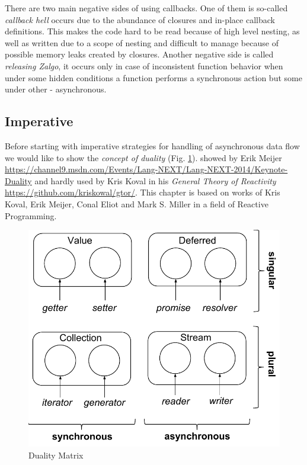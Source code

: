There are two main negative sides of using callbacks. One of them is so-called \textit{callback hell} occurs due to the abundance of closures and in-place callback definitions. This makes the code hard to be read because of high level nesting, as well as written due to a scope of nesting and difficult to manage because of possible memory leaks created by closures. Another negative side is called \textit{releasing Zalgo}\cite{zalgo}, it occurs only in case of inconsistent function behavior when under some hidden conditions a function performs a synchronous action but some under other - asynchronous.

\subsection{Imperative}
Before starting with imperative strategies for handling of asynchronous data flow we would like to show the \textit{concept of duality} (Fig. \ref{fig:dualityMatrix}). showed by Erik Meijer \url{https://channel9.msdn.com/Events/Lang-NEXT/Lang-NEXT-2014/Keynote-Duality} and hardly used by Kris Koval in his \textit{General Theory of Reactivity} \url{https://github.com/kriskowal/gtor/}. This chapter is based on works of Kris Koval, Erik Meijer, Conal Eliot and Mark S. Miller in a field of Reactive Programming.

\begin{figure}[ht]
	\label{fig:dualityMatrix}
	\centering
	\includegraphics[scale = 0.5]{grafiken/dualityMatrix}
	\caption{Duality Matrix \cite{gtor}}
\end{figure}

